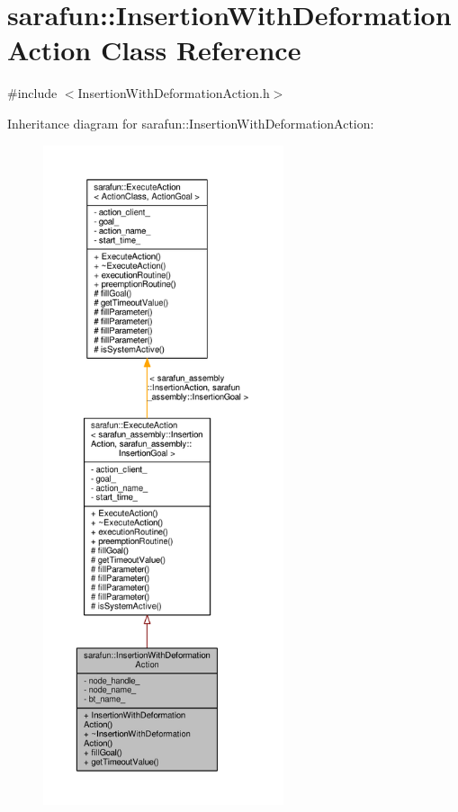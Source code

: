 \hypertarget{classsarafun_1_1InsertionWithDeformationAction}{\section{sarafun\-:\-:Insertion\-With\-Deformation\-Action Class Reference}
\label{classsarafun_1_1InsertionWithDeformationAction}
}


{\ttfamily \#include $<$Insertion\-With\-Deformation\-Action.\-h$>$}



Inheritance diagram for sarafun\-:\-:Insertion\-With\-Deformation\-Action\-:\nopagebreak
\begin{figure}[H]
\begin{center}
\leavevmode
\includegraphics[height=550pt]{de/dd8/classsarafun_1_1InsertionWithDeformationAction__inherit__graph}
\end{center}
\end{figure}


